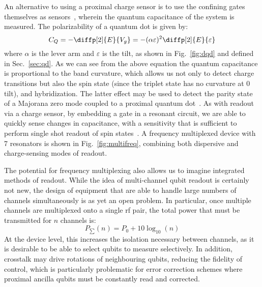 An alternative to using a proximal charge sensor is to use the confining gates themselves as sensors~\cite{PhysRevLett.110.046805}, wherein the quantum capacitance
of the system is measured. The polarizability of a quantum dot is given by:
\begin{equation}
  C_Q = - \diffp[2]{E}{{V_{g}}} = -(\alpha \varepsilon)^2 \diffp[2]{E}{\varepsilon}
\end{equation}
where $\alpha$ is the lever arm and $\varepsilon$ is the tilt, as shown in Fig.~\ref{fig:dqd} and defined in Sec.~\ref{sec:qd}. As we can see from the above equation
the quantum capacitance is proportional to the band curvature, which allows us not only to detect charge transitions but also the spin state (since the triplet state has no
curvature at 0 tilt), and hybridization. The latter effect may be used to detect the parity state of a Majorana zero mode coupled to a proximal
quantum dot~\cite{PhysRevB.95.235305}. As with readout via a charge sensor, by embedding a gate in a resonant circuit, we are able to quickly sense changes
in capacitance, with a sensitivity that is sufficient to perform single shot readout of spin states~\cite{fernando1,Nnano_dzurak}. A frequency multiplexed device
with 7 resonators is shown in Fig.~\ref{fig:multifreq}, combining both dispersive and charge-sensing modes of readout.

The potential for frequency multiplexing also allows us to imagine integrated methods of readout. While the idea of multi-channel qubit readout is certainly
not new, the design of equipment that are able to handle large numbers of channels simultaneously is as yet an open problem. In particular, once multiple
channels are multiplexed onto a single rf pair, the total power that must be transmitted for $n$ channels is:
\begin{equation}
  P_\sum(n) = P_0 + 10 \log_{10}(n)
\end{equation}
At the device level, this increases the isolation necessary between channels, as it is desirable to be able to select qubits to measure selectively. In addition,
crosstalk may drive rotations of neighbouring qubits, reducing the fidelity of control, which is particularly problematic for error correction schemes
where proximal ancilla qubits must be constantly read and corrected.

